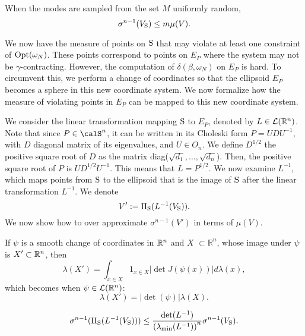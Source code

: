 \begin{corollary} \label{cor:measure}When the modes are sampled from the set $M$ uniformly random, 
\begin{equation*}\sigma^{n-1}(V_{\text{S}}) \leq m \mu(V). \end{equation*}
\end{corollary}

We now have the measure of points on $\text{S}$ that may violate at least one constraint of $\text{Opt}(\omega_N)$. These points correspond to points on $E_P$ where the system may not be $\gamma$-contracting. However, the computation of $\delta(\beta, \omega_N)$ on $E_P$ is hard. To circumvent this, we perform a change of coordinates so that the ellipsoid $E_P$ becomes a sphere in this new coordinate system. We now formalize how the measure of violating points in $E_P$ can be mapped to this new coordinate system.

We consider the linear transformation mapping $\text{S}$ to $E_P$, denoted by $L \in \mathcal{L}(\mathbb{R}^n)$. Note that since $P \in \calS^n$, it can be written in its Choleski form $P = U D U^{-1}$, with $D$ diagonal matrix of its eigenvalues, and $U \in O_n$. We define $D^{1/2}$ the positive square root of $D$ as the matrix diag($\sqrt{d_1},\dots, \sqrt{d_n}$). Then, the positive square root of $P$ is $U D^{1/2} U^{-1}$. This means that $L = P^{1/2}$. 
We now examine $L^{-1}$, which maps points from $\text{S}$ to the ellipsoid that is the image of $\text{S}$ after the linear transformation $L^{-1}$. We denote $$V':=\Pi_{\text{S}}(L^{-1}(V_{\text{S}})).$$
We now show how to over approximate $\sigma^{n-1}(V')$ in terms of $\mu(V)$.

\begin{remark} \label{rem:mappingMeasures}
If $\psi$ is a smooth change of coordinates in $\mathbb{R}^n$ and $X$ $\subset \mathbb{R}^n$, whose image under $\psi$ is $X' \subset \mathbb{R}^n$, then
\begin{equation}
\lambda(X') = \int_{x \in X} 1_{x \in X} |\det J(\psi(x))| d\lambda(x),
\end{equation}
which becomes when $\psi \in \mathcal{L}(\mathbb{R}^n)$:
\begin{equation}
\lambda(X') = |\det(\psi)| \lambda(X).
\end{equation}
\end{remark}

\begin{theorem} \label{lemma:lip}
\begin{equation}
\sigma^{n-1}(\Pi_{\text{S}}(L^{-1}(V_{\text{S}}))) \leq \frac{\det(L^{-1})}{\left(\lambda_{\min}(L^{-1})\right)^n} \sigma^{n-1}(V_{\text{S}}).
\end{equation}   
\end{theorem}

